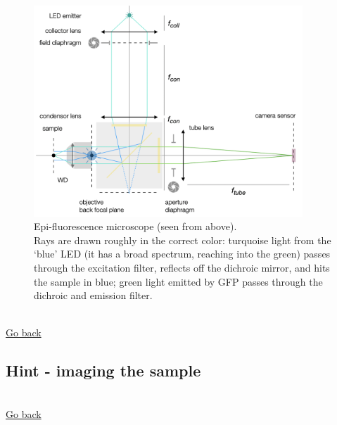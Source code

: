 \documentclass[a4paper]{report}
\begin{document}
\begin{figure}[h]
	\center
	\includegraphics[width=0.9\textwidth]{figures/epifluo.png}
	\captionsetup{width=0.9\textwidth}
	\caption{Epi-fluorescence microscope (seen from above).
	\\
	Rays are drawn roughly in the correct color: turquoise light from the `blue' LED (it has a broad spectrum, reaching into the green) passes through the excitation filter, reflects off the dichroic mirror, and hits the sample in blue; green light emitted by GFP passes through the dichroic and emission filter.}
	\label{fig:epifluo}
\end{figure}
\\
   \hyperlink{hintBack-illumination}{Go back}
   \clearpage
   \subsection{Hint - imaging the sample}
\hypertarget{hintTo-imaging}{}
   \\
   \hyperlink{hintBack-imaging}{Go back}
   \clearpage
   
\end{document}
